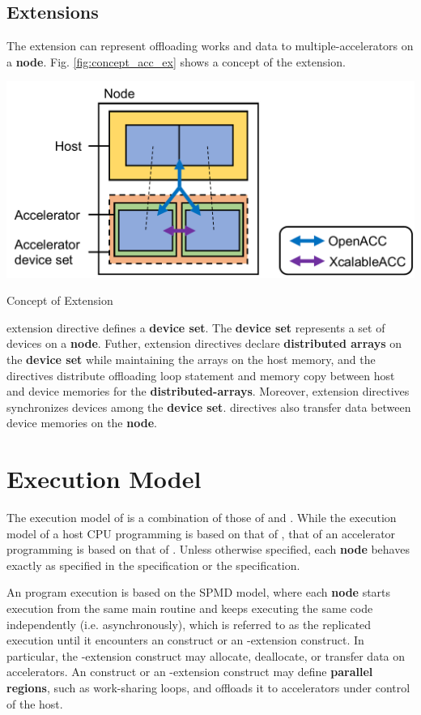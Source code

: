 \subsection{{\OACC} Extensions}
The {\OACC} extension can represent offloading works and data to multiple-accelerators on a {\bf node}.
Fig. \ref{fig:concept_acc_ex} shows a concept of the {\OACC} extension.

\begin{myfigure}
\includegraphics[scale=0.5,clip]{figs/concept_acc_ext.pdf}
  \caption{Concept of {\OACC} Extension}\label{fig:concept_acc_ex}
\end{myfigure}

{\OACC} extension directive defines a {\bf device set}.
The {\bf device set} represents a set of devices on a {\bf node}.
Futher, {\OACC} extension directives declare {\bf distributed arrays} on the {\bf device set} while maintaining the arrays on the host memory, and the directives distribute offloading loop statement and memory copy between host and device memories for the {\bf distributed-arrays}.
Moreover, {\OACC} extension directives synchronizes devices among the {\bf device set}.
{\XACC} directives also transfer data between device memories on the {\bf node}.

\section{Execution Model}
The execution model of {\XACC} is a combination of those of {\XMP} and {\OACC}.
While the execution model of a host CPU programming is based on that of {\XMP},
that of an accelerator programming is based on that of {\OACC}.
Unless otherwise specified,
each {\bf node} behaves exactly as specified in the {\XMP} specification\cite{xmp} or the {\OACC} specification\cite{openacc}.

An {\XACC} program execution is based on the SPMD model, 
where each {\bf node} starts execution from the same main routine and keeps executing the same code independently (i.e. asynchronously), 
which is referred to as the replicated execution
until it encounters an {\XMP} construct or an {\XMP}-extension construct.
In particular,
the {\XMP}-extension construct may allocate, deallocate, or transfer data on accelerators.
An {\OACC} construct or an {\OACC}-extension construct may define {\bf parallel regions}, such as work-sharing loops, 
and offloads it to accelerators under control of the host.


